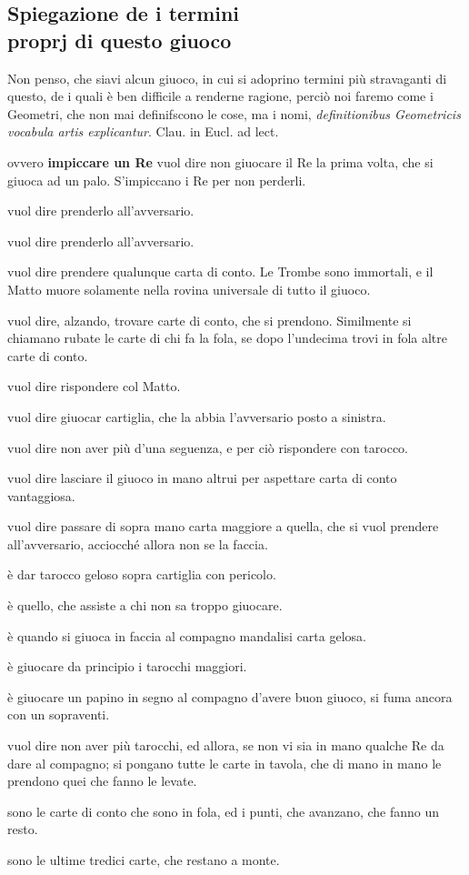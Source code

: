\documentclass[11pt,a6paper]{article}
\begin{document}
\subsection{Spiegazione de i termini\\ proprj di questo giuoco}

Non penso, che siavi alcun giuoco, in
cui si adoprino termini più stravaganti
di questo, de i quali è ben difficile a renderne
ragione, perciò noi faremo come i Geometri,
che non mai definifscono le cose, ma
i nomi, \textit{definitionibus Geometricis vocabula
artis explicantur}. Clau. in Eucl. ad lect.
\begin{description}
\setlength{\itemsep}{-3pt}
\item[Affogare un Re] ovvero {\bf impiccare un
Re} vuol dire non giuocare il Re la prima
volta, che si giuoca ad un palo. S'impiccano i
Re per non perderli.
\item[Ammazzare un Re] vuol dire prenderlo
all'avversario.
\item[Ammazzare un Papa] vuol dire prenderlo
all'avversario.
\item[Morire] vuol dire prendere qualunque
carta di conto. Le Trombe sono immortali,
e il Matto muore solamente nella rovina
universale di tutto il giuoco.
\item[Rubare] vuol dire, alzando, trovare
carte di conto, che si prendono. Similmente
si chiamano rubate le carte di chi fa la fola, se
dopo l'undecima trovi in fola altre carte di
conto.
\item[Smattare] vuol dire rispondere col Matto.
\item[Rifitta] vuol dire giuocar cartiglia, che la
abbia l'avversario posto a sinistra.
\item[Fare] vuol dire non aver più d'una seguenza,
e per ciò rispondere con tarocco.
\item[Far caccia] vuol dire lasciare il giuoco in
mano altrui per aspettare carta di conto
vantaggiosa.
\item[Far tenuta] vuol dire passare di sopra mano
carta maggiore a quella, che si vuol prendere
all'avversario, acciocché allora non se
la faccia.
\item[Far passata] è dar tarocco geloso sopra
 cartiglia con pericolo.
 \item[Ganzo] è quello, che assiste a chi
non sa troppo giuocare.
\item[Girare una carta] è quando si giuoca in
faccia al compagno mandalisi carta gelosa.
\item[Girare il gioco] è giuocare da principio
i tarocchi maggiori.
\item[Fumare] è giuocare un papino in segno al
compagno d'avere buon giuoco, si fuma
ancora con un sopraventi.
\item[Cascare] vuol dire non aver più tarocchi,
ed allora, se non vi sia in mano qualche Re
da dare al compagno; si pongano tutte le carte
in tavola, che di mano in mano le prendono
quei che fanno le levate.
\item[Entragnos] sono le carte di conto che sono
in fola, ed i punti, che avanzano, che
fanno un resto.
\item[Fola] sono le ultime tredici carte,
 che restano a monte.
 \end{description}
\end{document}
